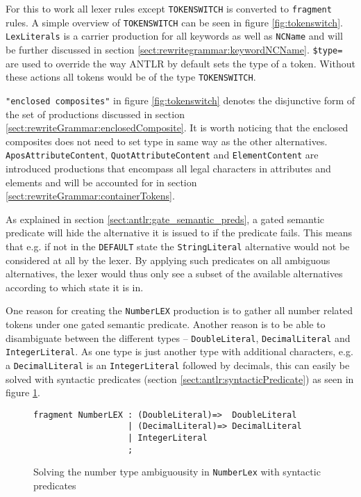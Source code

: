 For this to work all lexer rules except \verb!TOKENSWITCH! is converted to \verb!fragment! rules. A simple overview of \verb!TOKENSWITCH! can be seen in figure \ref{fig:tokenswitch}. \verb!LexLiterals! is a carrier production for all keywords as well as \verb!NCName! and will be further discussed in section \ref{sect:rewritegrammar:keywordNCName}. \verb!$type=! are used to override the way ANTLR by default sets the type of a token. Without these actions all tokens would be of the type \verb!TOKENSWITCH!.

\verb!"enclosed composites"! in figure \ref{fig:tokenswitch} denotes the disjunctive form of the set of productions discussed in section \ref{sect:rewriteGrammar:enclosedComposite}. It is worth noticing that the enclosed composites does not need to set type in same way as the other alternatives. \verb!AposAttributeContent!, \verb!QuotAttributeContent! and \verb!ElementContent! are introduced productions that encompass all legal characters in attributes and elements and will be accounted for in section \ref{sect:rewriteGrammar:containerTokens}.

As explained in section \ref{sect:antlr:gate_semantic_preds}, a gated semantic predicate will hide the alternative it is issued to if the predicate fails. This means that e.g. if not in the \verb!DEFAULT! state the \verb!StringLiteral! alternative would not be considered at all by the lexer. By applying such predicates on all ambiguous alternatives, the lexer would thus only see a subset of the available alternatives according to which state it is in.

One reason for creating the \verb!NumberLEX! production is to gather all number related tokens under one gated semantic predicate. Another reason is to be able to disambiguate between the different types -- \verb!DoubleLiteral!, \verb!DecimalLiteral! and \verb!IntegerLiteral!. As one type is just another type with additional characters, e.g. a \verb!DecimalLiteral! is an \verb!IntegerLiteral! followed by decimals, this can easily be solved with syntactic predicates (section \ref{sect:antlr:syntacticPredicate}) as seen in figure \ref{fig:numberLex}.

\begin{figure}[h!]
\begin{Verbatim}
fragment NumberLEX : (DoubleLiteral)=>	DoubleLiteral
                   | (DecimalLiteral)=> DecimalLiteral
                   | IntegerLiteral
                   ;
\end{Verbatim}
\caption[Solving the number type ambiguousity]{Solving the number type ambiguousity in \texttt{NumberLex} with syntactic predicates}
\label{fig:numberLex}
\end{figure}

